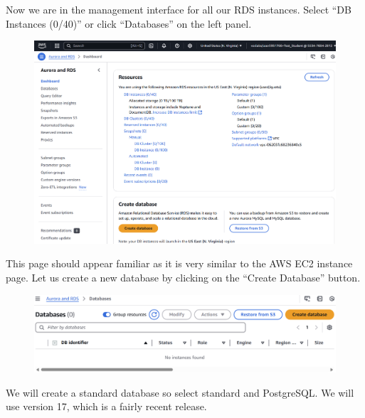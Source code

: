 \documentclass{csse4400}
\begin{document}
\noindent
Now we are in the management interface for all our RDS instances.
Select ``DB Instances (0/40)'' or click ``Databases'' on the left panel.

\begin{figure}[H]
\includegraphics[width=\textwidth]{images/aws_2}
\end{figure}

\noindent
This page should appear familiar as it is very similar to the AWS EC2 instance page.
Let us create a new database by clicking on the ``Create Database'' button.

\begin{figure}[H]
\includegraphics[width=\textwidth]{images/aws_3}
\end{figure}



\newpage
\noindent
We will create a standard database so select standard and PostgreSQL.
We will use version 17, which is a fairly recent release.
\end{document}
